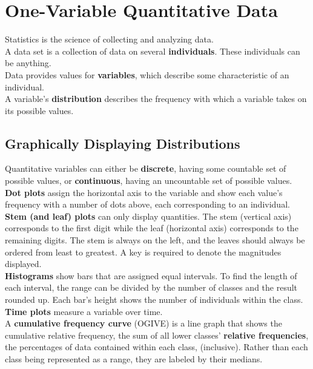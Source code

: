 \documentclass[../AP_Statistics.tex]{subfiles}
\begin{document}
	\chapter{One-Variable Quantitative Data}
		Statistics is the science of collecting and analyzing data. \\
		A data set is a collection of data on several \textbf{individuals}. These individuals can be anything. \\
		Data provides values for \textbf{variables}, which describe some characteristic of an individual. \\
		A variable's \textbf{distribution} describes the frequency with which a variable takes on its possible values.
		\section{Graphically Displaying Distributions}
			Quantitative variables can either be \textbf{discrete}, having some countable set of possible values, or \textbf{continuous}, having an uncountable set of possible values.
			\textbf{Dot plots} assign the horizontal axis to the variable and show each value's frequency with a number of dots above, each corresponding to an individual. \\
			\textbf{Stem (and leaf) plots} can only display quantities. The stem (vertical axis) corresponds to the first digit while the leaf (horizontal axis) corresponds to the remaining digits. The stem is always on the left, and the leaves should always be ordered from least to greatest. A key is required to denote the magnitudes displayed. \\
			\textbf{Histograms} show bars that are assigned equal intervals. To find the length of each interval, the range can be divided by the number of classes and the result rounded up. Each bar's height shows the number of individuals within the class. \\
			\textbf{Time plots} measure a variable over time. \\
			A \textbf{cumulative frequency curve} (OGIVE) is a line graph that shows the cumulative relative frequency, the sum of all lower classes' \textbf{relative frequencies}, the percentages of data contained within each class, (inclusive). Rather than each class being represented as a range, they are labeled by their medians.
\end{document}
